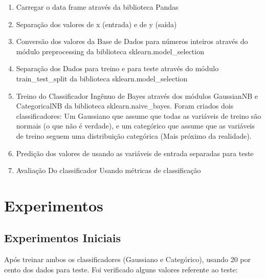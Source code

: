 \documentclass[conference]{IEEEtran}
\begin{document}
\begin{enumerate}
\item Carregar o data frame através da biblioteca Pandas
\item Separação dos valores de x (entrada) e de y (saída)
\item Conversão dos valores da Base de Dados para números inteiros através do módulo preprocessing da biblioteca sklearn.model\_selection
\item Separação dos Dados para treino e para teste através do módulo train\_test\_split da biblioteca sklearn.model\_selection
\item Treino do Classificador Ingênuo de Bayes através dos módulos GaussianNB e CategoricalNB da biblioteca sklearn.naive\_bayes. Foram criados dois classificadores: Um Gaussiano que assume que todas as variáveis de treino são normais (o que não é verdade), e um categórico que assume que as variáveis de treino seguem uma distribuição categórica (Mais próximo da realidade).
\item Predição dos valores de usando as variáveis de entrada separadas para teste
\item Avaliação Do classificador Usando métricas de classificação
\end{enumerate}

\section{Experimentos}

\subsection{Experimentos Iniciais}
Após treinar ambos os classificadores (Gaussiano e Categórico), usando 20 por cento dos dados para teste. Foi verificado alguns valores referente ao teste:
\end{document}
